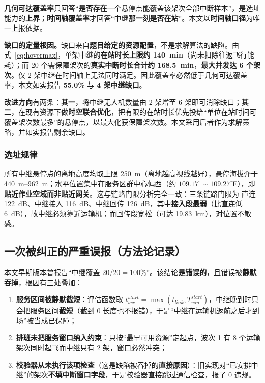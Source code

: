 \textbf{几何可达覆盖率}只回答“\textbf{是否存在}一个悬停点能覆盖该架次全部中断样本”，是选址能力的\textbf{上界}；\textbf{时间轴覆盖率}才回答“中继\textbf{那一刻是否在站}”。本文以\textbf{时间轴口径}为唯一上报依据。

\textbf{缺口的定量根因。}缺口来自\textbf{题目给定的资源配置}，不是求解算法的缺陷。由式~\eqref{eq:hovermax}，单架中继的\textbf{在站时长上限约 \SI{140}{min}}（尚未扣除往返飞行能耗）；而 20 个需保障架次的\textbf{真实中断时长合计约 \SI{168.5}{min}}，\textbf{最大并发达 6 个架次}。仅 2 架中继在时间轴上无法同时满足。因此覆盖率必然低于几何可达覆盖率，本文如实报告 \textbf{55.0\%} 与 \textbf{4 架中继缺口}。

\textbf{改进方向}有两条：\textbf{其一}，将中继无人机数量由 2 架增至 6 架即可消除缺口；\textbf{其二}，在现有资源下做\textbf{时空联合优化}，把有限的在站时长优先投给“单位在站时间可覆盖架次数最多”的悬停点，以最大化获保障架次数。本文采用后者作为求解策略，并如实报告剩余缺口。

\subsubsection{选址规律}

所有中继悬停点的离地高度均取上限 \SI{250}{m}（离地越高视线越好），悬停海拔介于 \SIrange{440}{962}{m}；水平位置集中在服务区群中心偏西（约 $109.17^\circ\sim109.27^\circ$E），即\textbf{贴近作业空域而非贴近网关}。这与链路门限分析完全一致：三条链路门限为 直连 \SI{122}{dB}、中继接入 \SI{116}{dB}、中继回传 \SI{126}{dB}，其中\textbf{接入段最弱}（比直连低 \SI{6}{dB}），故中继必须靠近运输机；而回传段宽松（可达 \SI{19.83}{km}），对位置不敏感。

\subsection{一次被纠正的严重误报（方法论记录）}\label{sec:q3bug}

本文早期版本曾报告“中继覆盖 $20/20=100\%$”。该结论\textbf{是错误的}，且错误被\textbf{静默吞掉}，根因有三处叠加：

\begin{enumerate}[label=(\arabic*),leftmargin=2em]
	\item \textbf{服务区间被静默截短}：评估函数取 $t_{svc}^{start}=\max(t_{link},T_{win}^{start})$，中继晚到时只会把服务区间\textbf{截短}（截到 0 长度也不报错），于是“中继在运输机返航之后才到场”被当成已保障；
	\item \textbf{排班未把服务窗口纳入约束}：只按“最早可用资源”定起点，波次 1 有 8 个运输架次同时起飞而中继只有 2 架，窗口必然冲突；
	\item \textbf{校验器从未执行该项检查}（这是缺陷被吞掉的\textbf{直接原因}）：旧实现对“已安排中继”的架次\textbf{不填中断窗口字段}，于是校验器直接跳过通信检查，报了 0 违规。
\end{enumerate}

